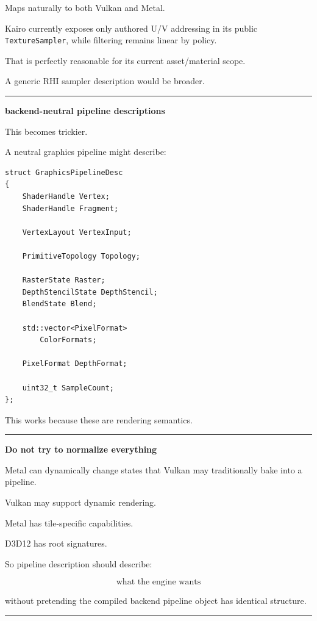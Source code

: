 Maps naturally to both Vulkan and Metal.

Kairo currently exposes only authored U/V addressing in its public \texttt{TextureSampler}, while filtering remains linear by policy.

That is perfectly reasonable for its current asset/material scope.

A generic RHI sampler description would be broader.

\begin{center}\rule{0.5\linewidth}{0.5pt}\end{center}

\textbf{backend-neutral pipeline descriptions}

This becomes trickier.

A neutral graphics pipeline might describe:

\begin{verbatim}
struct GraphicsPipelineDesc
{
    ShaderHandle Vertex;
    ShaderHandle Fragment;

    VertexLayout VertexInput;

    PrimitiveTopology Topology;

    RasterState Raster;
    DepthStencilState DepthStencil;
    BlendState Blend;

    std::vector<PixelFormat>
        ColorFormats;

    PixelFormat DepthFormat;

    uint32_t SampleCount;
};
\end{verbatim}

This works because these are rendering semantics.

\begin{center}\rule{0.5\linewidth}{0.5pt}\end{center}

\textbf{Do not try to normalize everything}

Metal can dynamically change states that Vulkan may traditionally bake into a pipeline.

Vulkan may support dynamic rendering.

Metal has tile-specific capabilities.

D3D12 has root signatures.

So pipeline description should describe:

\[
\boxed{\text{what the engine wants}}
\]

without pretending the compiled backend pipeline object has identical structure.

\begin{center}\rule{0.5\linewidth}{0.5pt}\end{center}


